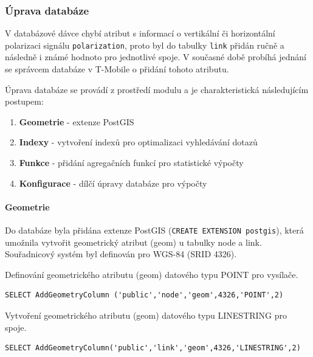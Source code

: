 \documentclass[a4paper,12pt,oneside]{report}
\begin{document}
\subsubsection*{Úprava databáze}
\label{subsubsec:upravadatabaze}  
 V databázové dávce chybí atribut s informací o vertikální či horizontální polarizaci signálu \texttt{polarization}, proto byl do tabulky \texttt{link} přidán ručně a následně i známé hodnoto pro jednotlivé spoje. V současné době probíhá jednání se správcem databáze v T-Mobile o přidání tohoto atributu.
 
Úprava databáze se provádí z prostředí modulu a je charakteristická následujícím postupem:
\begin{enumerate}
\item \textbf{Geometrie} - extenze PostGIS
\item \textbf{Indexy} - vytvoření indexů pro optimalizaci vyhledávání dotazů
\item \textbf{Funkce} - přidání agregačních funkcí pro statistické výpočty
\item \textbf{Konfigurace} - dílčí úpravy databáze pro výpočty
\end{enumerate}

\paragraph*{Geometrie} Do databáze byla přidána extenze PostGIS (\texttt{CREATE EXTENSION postgis}), která umožnila vytvořit geometrický atribut (geom) u tabulky node a link. Souřadnicový systém byl definován pro WGS-84 (SRID 4326).

Definování geometrického atributu (geom) datového typu POINT pro vysílače. 

\begin{footnotesize}
\begin{lstlisting}[style=mybash]
SELECT AddGeometryColumn ('public','node','geom',4326,'POINT',2)
\end{lstlisting}
\end{footnotesize}

Vytvoření geometrického atributu (geom) datového typu LINESTRING pro spoje. 

\begin{footnotesize}
\begin{lstlisting}[style=mybash]
SELECT AddGeometryColumn('public','link','geom',4326,'LINESTRING',2)
\end{lstlisting}
\end{footnotesize}
\end{document}
